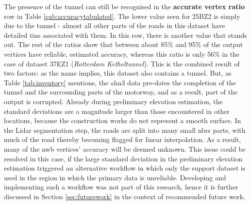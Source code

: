 The presence of the tunnel can still be recognised in the \textbf{accurate vertex ratio} row in Table \ref{sub:accuracytabulated}. The lower value seen for 25BZ2 is simply due to the tunnel - almost all other parts of the roads in this dataset have detailed \ac{tin}s associated with them. In this row, there is another value that stands out. The rest of the ratios show that between about 85\% and 95\% of the output vertices have reliable, estimated accuracy, whereas this ratio is only 56\% in the case of dataset 37EZ1 (\textit{Rotterdam Ketheltunnel}). This is the combined result of two factors: as the name implies, this dataset also contains a tunnel. But, as Table \ref{tab:inventory} mentions, the \ac{ahn3} data pre-dates the completion of the tunnel and the surrounding parts of the motorway, and as a result, part of the output is corrupted. Already during preliminary elevation estimation, the standard deviations are a magnitude larger than those encountered in other locations, because the construction works do not represent a smooth surface. In the Lidar segmentation step, the roads are split into many small \ac{nbrs} parts, with much of the road thereby becoming flagged for linear interpolation. As a result, many of the \ac{nwb} vertices' accuracy will be deemed unknown. This issue could be resolved in this case, if the large standard deviation in the preliminary elevation estimation triggered an alternative workflow in which only the support dataset is used in the region in which the primary data is unreliable. Developing and implementing such a workflow was not part of this research, hence it is further discussed in Section \ref{sec:futurework} in the context of recommended future work.

\begin{table}
    \caption[Tabulated 3D-NWB accuracy and completeness results per testing dataset]{Tabulated 3D-NWB accuracy and completeness results per testing dataset. Results based on original and densified NWB vertices.}
    \label{tab:accuracytabulated}
\end{table}

